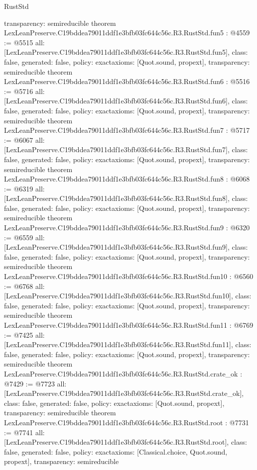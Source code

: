 \begin{lexlean}{RustStd}
\begin{coremodule}
{  transparency: semireducible
}
theorem LexLeanPreserve.C19bddea79011ddf1e3bfb03fc644c56c.R3.RustStd.fun5 : @4559 := @5515 {
  all: [LexLeanPreserve.C19bddea79011ddf1e3bfb03fc644c56c.R3.RustStd.fun5],
  class: false,
  generated: false,
  policy: exact{axioms: [Quot.sound, propext]},
  transparency: semireducible
}
theorem LexLeanPreserve.C19bddea79011ddf1e3bfb03fc644c56c.R3.RustStd.fun6 : @5516 := @5716 {
  all: [LexLeanPreserve.C19bddea79011ddf1e3bfb03fc644c56c.R3.RustStd.fun6],
  class: false,
  generated: false,
  policy: exact{axioms: [Quot.sound, propext]},
  transparency: semireducible
}
theorem LexLeanPreserve.C19bddea79011ddf1e3bfb03fc644c56c.R3.RustStd.fun7 : @5717 := @6067 {
  all: [LexLeanPreserve.C19bddea79011ddf1e3bfb03fc644c56c.R3.RustStd.fun7],
  class: false,
  generated: false,
  policy: exact{axioms: [Quot.sound, propext]},
  transparency: semireducible
}
theorem LexLeanPreserve.C19bddea79011ddf1e3bfb03fc644c56c.R3.RustStd.fun8 : @6068 := @6319 {
  all: [LexLeanPreserve.C19bddea79011ddf1e3bfb03fc644c56c.R3.RustStd.fun8],
  class: false,
  generated: false,
  policy: exact{axioms: [Quot.sound, propext]},
  transparency: semireducible
}
theorem LexLeanPreserve.C19bddea79011ddf1e3bfb03fc644c56c.R3.RustStd.fun9 : @6320 := @6559 {
  all: [LexLeanPreserve.C19bddea79011ddf1e3bfb03fc644c56c.R3.RustStd.fun9],
  class: false,
  generated: false,
  policy: exact{axioms: [Quot.sound, propext]},
  transparency: semireducible
}
theorem LexLeanPreserve.C19bddea79011ddf1e3bfb03fc644c56c.R3.RustStd.fun10 : @6560 := @6768 {
  all: [LexLeanPreserve.C19bddea79011ddf1e3bfb03fc644c56c.R3.RustStd.fun10],
  class: false,
  generated: false,
  policy: exact{axioms: [Quot.sound, propext]},
  transparency: semireducible
}
theorem LexLeanPreserve.C19bddea79011ddf1e3bfb03fc644c56c.R3.RustStd.fun11 : @6769 := @7425 {
  all: [LexLeanPreserve.C19bddea79011ddf1e3bfb03fc644c56c.R3.RustStd.fun11],
  class: false,
  generated: false,
  policy: exact{axioms: [Quot.sound, propext]},
  transparency: semireducible
}
theorem LexLeanPreserve.C19bddea79011ddf1e3bfb03fc644c56c.R3.RustStd.crate_ok : @7429 := @7723 {
  all: [LexLeanPreserve.C19bddea79011ddf1e3bfb03fc644c56c.R3.RustStd.crate_ok],
  class: false,
  generated: false,
  policy: exact{axioms: [Quot.sound, propext]},
  transparency: semireducible
}
theorem LexLeanPreserve.C19bddea79011ddf1e3bfb03fc644c56c.R3.RustStd.root : @7731 := @7741 {
  all: [LexLeanPreserve.C19bddea79011ddf1e3bfb03fc644c56c.R3.RustStd.root],
  class: false,
  generated: false,
  policy: exact{axioms: [Classical.choice, Quot.sound, propext]},
  transparency: semireducible
}


\end{coremodule}
\end{lexlean}
